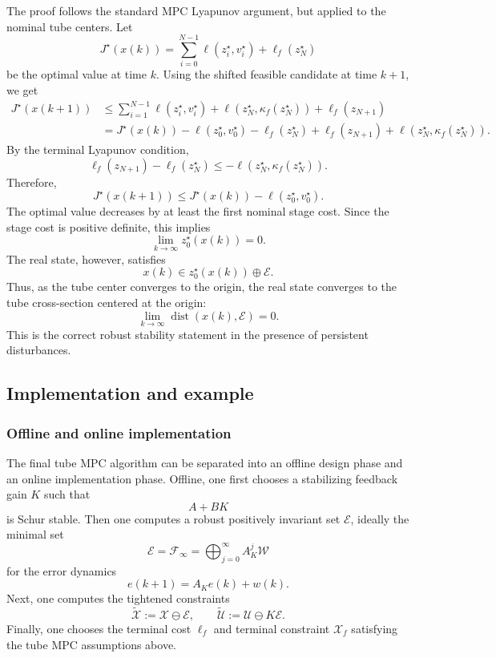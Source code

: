 The proof follows the standard MPC Lyapunov argument, but applied to the nominal tube centers.
Let
\[
    J^\star(x(k))
    =
    \sum_{i=0}^{N-1}\ell(z_i^\star,v_i^\star)+\ell_f(z_N^\star)
\]
be the optimal value at time \(k\). Using the shifted feasible candidate at time \(k+1\), we get
\[
\begin{aligned}
    J^\star(x(k+1))
    &\leq
    \sum_{i=1}^{N-1}\ell(z_i^\star,v_i^\star)
    +
    \ell(z_N^\star,\kappa_f(z_N^\star))
    +
    \ell_f(z_{N+1})
    \\
    &=
    J^\star(x(k))
    -
    \ell(z_0^\star,v_0^\star)
    -
    \ell_f(z_N^\star)
    +
    \ell_f(z_{N+1})
    +
    \ell(z_N^\star,\kappa_f(z_N^\star)).
\end{aligned}
\]
By the terminal Lyapunov condition,
\[
    \ell_f(z_{N+1})-\ell_f(z_N^\star)
    \leq
    -\ell(z_N^\star,\kappa_f(z_N^\star)).
\]
Therefore,
\[
    J^\star(x(k+1))
    \leq
    J^\star(x(k))
    -
    \ell(z_0^\star,v_0^\star).
\]
The optimal value decreases by at least the first nominal stage cost. Since the stage cost is
positive definite, this implies
\[
    \lim_{k\to\infty} z_0^\star(x(k))=0.
\]
The real state, however, satisfies
\[
    x(k)\in z_0^\star(x(k))\oplus\mathcal E.
\]
Thus, as the tube center converges to the origin, the real state converges to the tube cross-section
centered at the origin:
\[
    \lim_{k\to\infty}\operatorname{dist}(x(k),\mathcal E)=0.
\]
This is the correct robust stability statement in the presence of persistent disturbances.

\subsection{Implementation and example}

\subsubsection{Offline and online implementation}

The final tube MPC algorithm can be separated into an offline design phase and an online
implementation phase. Offline, one first chooses a stabilizing feedback gain \(K\) such that
\[
    A+BK
\]
is Schur stable. Then one computes a robust positively invariant set \(\mathcal E\), ideally the
minimal set
\[
    \mathcal E=\mathcal F_\infty
    =
    \bigoplus_{j=0}^{\infty}A_K^j\mathcal W
\]
for the error dynamics
\[
    e(k+1)=A_Ke(k)+w(k).
\]
Next, one computes the tightened constraints
\[
    \widetilde{\mathcal X}:=\mathcal X\ominus\mathcal E,
    \qquad
    \widetilde{\mathcal U}:=\mathcal U\ominus K\mathcal E.
\]
Finally, one chooses the terminal cost \(\ell_f\) and terminal constraint \(\mathcal X_f\)
satisfying the tube MPC assumptions above.\\

